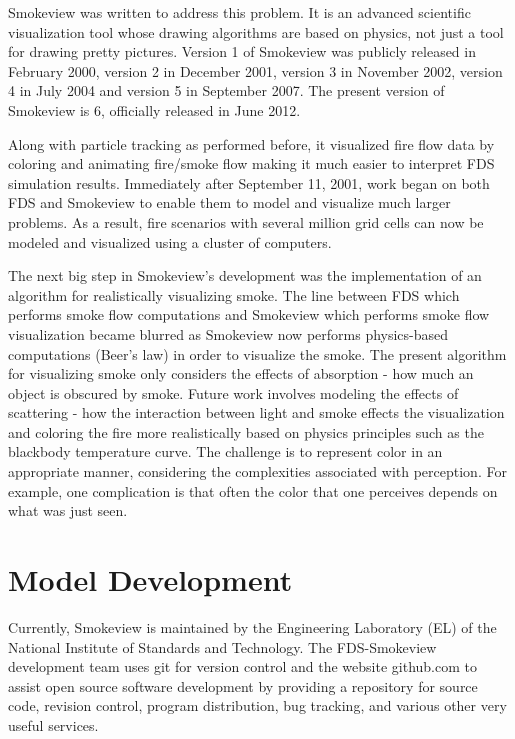 \documentclass[11pt,twoside]{book}
\begin{document}
Smokeview was written to address this problem. It is an advanced
scientific visualization tool whose drawing algorithms are based
on physics, not just a tool for drawing pretty pictures. Version 1
of Smokeview was publicly released in February 2000, version 2 in
December 2001, version 3 in November 2002, version 4 in July
2004 and version 5 in September 2007.
The present version of Smokeview is 6, officially released
in June 2012.

Along with particle tracking as performed before, it visualized
fire flow data by coloring and animating fire/smoke flow making it
much easier to interpret FDS simulation results.  Immediately
after September 11, 2001, work began on both FDS and Smokeview to
enable them to model and visualize much larger problems.  As a
result, fire scenarios with several million grid cells can now be
modeled and visualized using a cluster of computers.

The next big step in Smokeview's development was the
implementation of an algorithm for realistically visualizing
smoke. The line between FDS which performs smoke flow computations
and Smokeview which performs smoke flow visualization became
blurred as Smokeview now performs physics-based computations
(Beer's law) in order to visualize the smoke.  The present
algorithm for visualizing smoke only considers the effects of
absorption - how much an object is obscured by smoke.  Future work
involves modeling the effects of scattering - how the interaction
between light and smoke effects the visualization and coloring the
fire more realistically based on physics principles such as the
blackbody temperature curve.  The challenge is to represent color
in an appropriate manner, considering the complexities associated
with perception.  For example, one complication is that often the
color that one perceives depends on what was just seen.

%
%

\section{Model Development}
Currently, Smokeview is maintained by the Engineering Laboratory
(EL) of the National Institute of Standards and Technology.
The FDS-Smokeview development team uses git for version control
and the website github.com to assist open source software
development by providing a repository for source code, revision
control, program distribution, bug tracking, and various other
very useful services.
\end{document}
